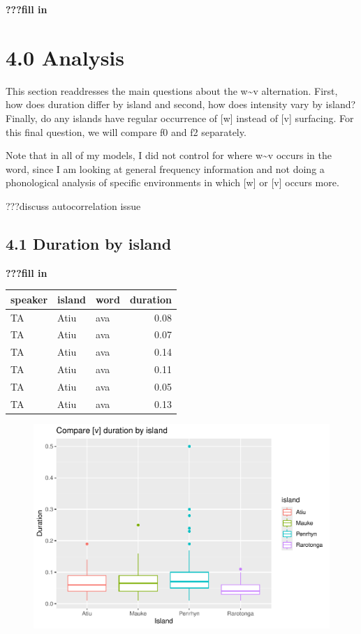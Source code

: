 \documentclass[
  ,man,floatsintext]{apa6}
\begin{document}
\textbf{???fill in}

\section{4.0 Analysis}\label{analysis}

This section readdresses the main questions about the w\textasciitilde v alternation. First, how does duration differ by island and second, how does intensity vary by island? Finally, do any islands have regular occurrence of {[}w{]} instead of {[}v{]} surfacing. For this final question, we will compare f0 and f2 separately.

Note that in all of my models, I did not control for where w\textasciitilde v occurs in the word, since I am looking at general frequency information and not doing a phonological analysis of specific environments in which {[}w{]} or {[}v{]} occurs more.

???discuss autocorrelation issue

\subsection{4.1 Duration by island}\label{duration-by-island}

\textbf{???fill in}

\begin{tabular}{l|l|l|r}
\hline
speaker & island & word & duration\\
\hline
TA & Atiu & ava & 0.08\\
\hline
TA & Atiu & ava & 0.07\\
\hline
TA & Atiu & ava & 0.14\\
\hline
TA & Atiu & ava & 0.11\\
\hline
TA & Atiu & ava & 0.05\\
\hline
TA & Atiu & ava & 0.13\\
\hline
\end{tabular}

\begin{figure}
\includegraphics[width=0.75\linewidth]{D2_CIM_files/figure-latex/print-duration-plot-1} \caption{ }\label{fig:print-duration-plot}
\end{figure}
\end{document}
